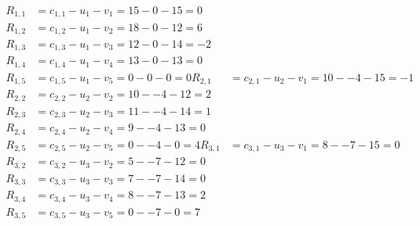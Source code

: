 \[
\begin{aligned}
R_{1,1} &= c_{1,1} - u_{1} - v_{1} = 15 - 0 - 15 = 0 \\
R_{1,2} &= c_{1,2} - u_{1} - v_{2} = 18 - 0 - 12 = 6 \\
R_{1,3} &= c_{1,3} - u_{1} - v_{3} = 12 - 0 - 14 = -2 \\
R_{1,4} &= c_{1,4} - u_{1} - v_{4} = 13 - 0 - 13 = 0 \\
R_{1,5} &= c_{1,5} - u_{1} - v_{5} = 0 - 0 - 0 = 0 
R_{2,1} &= c_{2,1} - u_{2} - v_{1} = 10 - -4 - 15 = -1 \\
R_{2,2} &= c_{2,2} - u_{2} - v_{2} = 10 - -4 - 12 = 2 \\
R_{2,3} &= c_{2,3} - u_{2} - v_{3} = 11 - -4 - 14 = 1 \\
R_{2,4} &= c_{2,4} - u_{2} - v_{4} = 9 - -4 - 13 = 0 \\
R_{2,5} &= c_{2,5} - u_{2} - v_{5} = 0 - -4 - 0 = 4 
R_{3,1} &= c_{3,1} - u_{3} - v_{1} = 8 - -7 - 15 = 0 \\
R_{3,2} &= c_{3,2} - u_{3} - v_{2} = 5 - -7 - 12 = 0 \\
R_{3,3} &= c_{3,3} - u_{3} - v_{3} = 7 - -7 - 14 = 0 \\
R_{3,4} &= c_{3,4} - u_{3} - v_{4} = 8 - -7 - 13 = 2 \\
R_{3,5} &= c_{3,5} - u_{3} - v_{5} = 0 - -7 - 0 = 7 
\end{aligned}
\]

